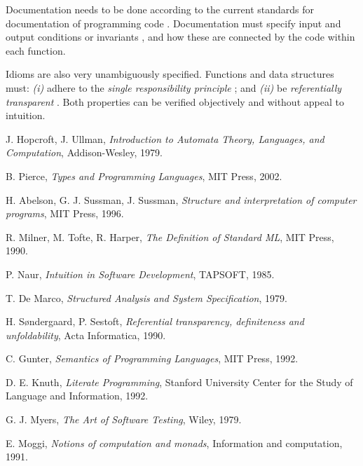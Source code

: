 \documentclass[a4paper, 10pt]{article}
\begin{document}
			Documentation needs to be done according to the current standards for documentation of programming code \cite{literateProgramming}. Documentation must specify input and output conditions or invariants \cite{semanticsOfProgrammingLanguages}, and how these are connected by the code within each function. 
			
			Idioms are also very unambiguously specified. Functions and data structures must: \textit{(i)} adhere to the \textit{single responsibility principle} \cite{singleResponsibilityPrinciple}; and \textit{(ii)} be \textit{referentially transparent} \cite{referentialTransparency}. Both properties can be verified objectively and without appeal to intuition.

\newpage

\begin{thebibliography}{1}

 J. Hopcroft, J. Ullman, {\em Introduction to Automata Theory, Languages, and Computation}, Addison-Wesley, 1979.

 B. Pierce, {\em Types and Programming Languages}, MIT Press, 2002.

 H. Abelson, G. J. Sussman, J. Sussman, {\em Structure and interpretation of computer programs}, MIT Press, 1996.

 R. Milner, M. Tofte, R. Harper, {\em The Definition of Standard ML}, MIT Press, 1990.

 P. Naur, {\em Intuition in Software Development},  TAPSOFT, 1985.

 T. De Marco, {\em Structured Analysis and System Specification}, 1979.

 H. Søndergaard, P. Sestoft, {\em Referential transparency, definiteness and unfoldability}, Acta Informatica, 1990.

 C. Gunter, {\em Semantics of Programming Languages}, MIT Press, 1992.

 D. E. Knuth, {\em Literate Programming}, Stanford University Center for the Study of Language and Information, 1992.

 G. J. Myers, {\em The Art of Software Testing}, Wiley, 1979.

 E. Moggi, {\em Notions of computation and monads}, Information and computation, 1991.


\end{thebibliography}
\end{document}
